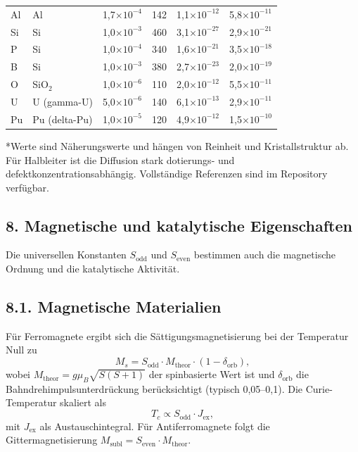 \documentclass[12pt,a4paper]{article}
\begin{document}
\begin{longtable}{p{1.2cm}p{1.2cm}p{2.0cm}p{2.5cm}p{2.5cm}p{2.5cm}}
		Al & Al & 1,7\(\times10^{-4}\) & 142 & 1,1\(\times10^{-12}\) & 5,8\(\times10^{-11}\) \\
		Si & Si & 1,0\(\times10^{-3}\) & 460 & 3,1\(\times10^{-27}\) & 2,9\(\times10^{-21}\) \\
		P & Si & 1,0\(\times10^{-4}\) & 340 & 1,6\(\times10^{-21}\) & 3,5\(\times10^{-18}\) \\
		B & Si & 1,0\(\times10^{-3}\) & 380 & 2,7\(\times10^{-23}\) & 2,0\(\times10^{-19}\) \\
		O & SiO\(_2\) & 1,0\(\times10^{-6}\) & 110 & 2,0\(\times10^{-12}\) & 5,5\(\times10^{-11}\) \\
		U & U (gamma-U) & 5,0\(\times10^{-6}\) & 140 & 6,1\(\times10^{-13}\) & 2,9\(\times10^{-11}\) \\
		Pu & Pu (delta-Pu) & 1,0\(\times10^{-5}\) & 120 & 4,9\(\times10^{-12}\) & 1,5\(\times10^{-10}\) \\
		\bottomrule
	\end{longtable}
	*Werte sind Näherungswerte und hängen von Reinheit und Kristallstruktur ab. Für Halbleiter ist die Diffusion stark dotierungs- und defektkonzentrationsabhängig. Vollständige Referenzen sind im Repository verfügbar.
	
	

\subsection*{8. Magnetische und katalytische Eigenschaften}

Die universellen Konstanten \(S_{\text{odd}}\) und \(S_{\text{even}}\) bestimmen auch die magnetische Ordnung und die katalytische Aktivität.

\subsection*{8.1. Magnetische Materialien}
Für Ferromagnete ergibt sich die Sättigungsmagnetisierung bei der Temperatur Null zu
\[
M_s = S_{\text{odd}} \cdot M_{\text{theor}} \cdot (1 - \delta_{\text{orb}}),
\]
wobei \(M_{\text{theor}} = g \mu_B \sqrt{S(S+1)}\) der spinbasierte Wert ist und \(\delta_{\text{orb}}\) die Bahndrehimpulsunterdrückung berücksichtigt (typisch 0,05–0,1). Die Curie-Temperatur skaliert als
\[
T_c \propto S_{\text{odd}} \cdot J_{\text{ex}},
\]
mit \(J_{\text{ex}}\) als Austauschintegral. Für Antiferromagnete folgt die Gittermagnetisierung \(M_{\text{subl}} = S_{\text{even}} \cdot M_{\text{theor}}\).
\end{document}
